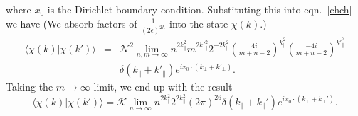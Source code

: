 \documentclass[letterpaper,12pt]{article}
\def\Pcm#1{{\mathcal{#1}}}
\def\nn{\nonumber}
\def\er#1{eqn.~\eqref{#1}}
\begin{document}
where $x_0$ is the Dirichlet boundary condition. 
Substituting this into \er{chch} we have
(We absorb factors of $\frac{1}{(2\epsilon)^{2h}}$ into the state $\chi(k)$.)
\begin{eqnarray}
\big\langle\chi(k)\big|\chi(k')\big\rangle
&=&\Pcm{N}^2 \lim_{n,m\rightarrow\infty} n^{2k_\parallel^2}m^{2{k'}_\parallel^2}
2^{-2k_\parallel^2}
\left(\frac{4i}{m+n-2}\right)^{k_\parallel^2}
\left(\frac{-4i}{m+n-2}\right)^{{k'}_\parallel^2} \nn\\
&& \delta(k_\parallel+k'_\parallel)e^{ix_0\cdot(k_\perp+k'_\perp)}
.\end{eqnarray}
Taking the $m\rightarrow\infty$ limit, we end up with the result
\begin{equation}
\label{Achichi}
\big\langle\chi(k)\big|\chi(k')\big\rangle
 =\Pcm{K}
 \lim_{n\rightarrow\infty} n^{2k_\parallel^2}
 2^{2k_\parallel^2}
 (2\pi)^{26}\delta(k_\parallel+k_\parallel')e^{ix_0\cdot (k_\perp+k_\perp')}
.\end{equation}
\end{document}
